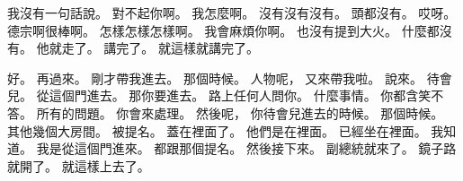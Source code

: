 \hypertarget{c01:cue:3215}{}我沒有一句話說。
\hypertarget{c01:cue:3216}{}對不起你啊。
\hypertarget{c01:cue:3217}{}我怎麼啊。
\hypertarget{c01:cue:3218}{}沒有沒有沒有。
\hypertarget{c01:cue:3219}{}頭都沒有。
\hypertarget{c01:cue:3220}{}哎呀。
\hypertarget{c01:cue:3221}{}德宗啊很棒啊。
\hypertarget{c01:cue:3222}{}怎樣怎樣怎樣啊。
\hypertarget{c01:cue:3223}{}我會麻煩你啊。
\hypertarget{c01:cue:3224}{}也沒有提到大火。
\hypertarget{c01:cue:3225}{}什麼都沒有。
\hypertarget{c01:cue:3226}{}他就走了。
\hypertarget{c01:cue:3227}{}講完了。
\hypertarget{c01:cue:3228}{}就這樣就講完了。

\hypertarget{c01:cue:3229}{}好。
\hypertarget{c01:cue:3230}{}再過來。
\hypertarget{c01:cue:3231}{}剛才帶我進去。
\hypertarget{c01:cue:3232}{}那個時候。
\hypertarget{c01:cue:3233}{}人物呢，
\hypertarget{c01:cue:3234}{}又來帶我啦。
\hypertarget{c01:cue:3235}{}說來。
\hypertarget{c01:cue:3236}{}待會兒。
\hypertarget{c01:cue:3237}{}從這個門進去。
\hypertarget{c01:cue:3238}{}那你要進去。
\hypertarget{c01:cue:3239}{}路上任何人問你。
\hypertarget{c01:cue:3240}{}什麼事情。
\hypertarget{c01:cue:3241}{}你都含笑不答。
\hypertarget{c01:cue:3242}{}所有的問題。
\hypertarget{c01:cue:3243}{}你會來處理。
\hypertarget{c01:cue:3244}{}然後呢，
\hypertarget{c01:cue:3245}{}你待會兒進去的時候。
\hypertarget{c01:cue:3246}{}那個時候。
\hypertarget{c01:cue:3247}{}其他幾個大房間。
\hypertarget{c01:cue:3248}{}被提名。
\hypertarget{c01:cue:3249}{}蓋在裡面了。
\hypertarget{c01:cue:3250}{}他們是在裡面。
\hypertarget{c01:cue:3251}{}已經坐在裡面。
\hypertarget{c01:cue:3252}{}我知道。
\hypertarget{c01:cue:3253}{}我是從這個門進來。
\hypertarget{c01:cue:3254}{}都跟那個提名。
\hypertarget{c01:cue:3255}{}然後接下來。
\hypertarget{c01:cue:3256}{}副總統就來了。
\hypertarget{c01:cue:3257}{}鏡子路就開了。
\hypertarget{c01:cue:3258}{}就這樣上去了。

